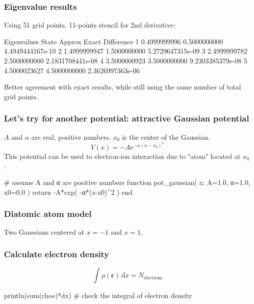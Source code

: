 \begin{frame}[fragile]
\frametitle{Eigenvalue results}

Using 51 grid points, 11-points stencil for 2nd derivative:
\begin{textcode}
Eigenvalues
State         Approx              Exact          Difference
   1       0.4999999996       0.5000000000   4.4949444167e-10
   2       1.4999999947       1.5000000000   5.2729647315e-09
   3       2.4999999782       2.5000000000   2.1831708441e-08
   4       3.5000000923       3.5000000000   9.2303385379e-08
   5       4.5000023627       4.5000000000   2.3626997363e-06
\end{textcode}

Better agreement with exact results, while still using the same number of total
grid points.

\end{frame}


\begin{frame}[fragile]
\frametitle{Let's try for another potential: attractive Gaussian potential}

$A$ and $\alpha$ are real, positive numbers.
$x_0$ is the center of the Gaussian.
\begin{equation*}
V(x) = -A \mathrm{e}^{-\alpha (x - x_0)^2}
\end{equation*}
This potential can be used to electron-ion interaction due to "atom" located
at $x_0$.

\begin{juliacode}
# assume A and α are positive numbers
function pot_gaussian( x; A=1.0, α=1.0, x0=0.0 )
    return -A*exp( -α*(x-x0)^2 )
end
\end{juliacode}

\end{frame}


\begin{frame}
\frametitle{Diatomic atom model}

Two Gaussians centered at $x = -1$ and $x = 1$.

\end{frame}



\begin{frame}[fragile]
\frametitle{Calculate electron density}

\begin{equation*}
\int \rho(\mathbf{r}) \, \mathrm{d}x = N_{\mathrm{electrons}}
\end{equation*}

\begin{juliacode}
println(sum(rhoe)*dx) # check the integral of electron density
\end{juliacode}

\end{frame}


